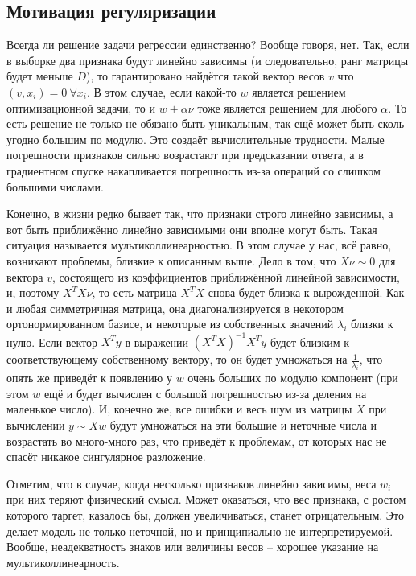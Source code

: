 \subsection{Мотивация регуляризации}

Всегда ли решение задачи регрессии единственно?
Вообще говоря, нет.
Так, если в выборке два признака будут линейно зависимы (и следовательно, ранг матрицы будет меньше $D$), то
гарантировано найдётся такой вектор весов $v$ что $(v,x_i) = 0~\forall x_i$.
В этом случае, если какой-то $w$ является решением оптимизационной задачи, то и $w+\alpha \nu$ тоже является
решением для любого $\alpha$.
То есть решение не только не обязано быть уникальным, так ещё может быть сколь угодно большим по модулю.
Это создаёт вычислительные трудности.
Малые погрешности признаков сильно возрастают при предсказании ответа, а в градиентном спуске накапливается
погрешность из-за операций со слишком большими числами.

Конечно, в жизни редко бывает так, что признаки строго линейно зависимы, а вот быть приближённо линейно зависимыми
они вполне могут быть.
Такая ситуация называется мультиколлинеарностью.
В этом случае у нас, всё равно, возникают проблемы, близкие к описанным выше.
Дело в том, что $X \nu \sim 0$ для вектора $v$, состоящего из коэффициентов приближённой линейной зависимости,
и, поэтому $X^T X \nu$, то есть матрица $X^T X$ снова будет близка к вырожденной.
Как и любая симметричная матрица, она диагонализируется в некотором ортонормированном базисе, и некоторые из
собственных значений $\lambda_i$ близки к нулю.
Если вектор $X^T y$ в выражении $(X^T X)^{-1} X^T y$ будет близким к соответствующему собственному вектору, то он
будет умножаться на $\frac{1}{\lambda_i}$, что опять же приведёт к появлению у $w$ очень больших по модулю
компонент (при этом $w$ ещё и будет вычислен с большой погрешностью из-за деления на маленькое число).
И, конечно же, все ошибки и весь шум из матрицы $X$ при вычислении $y \sim X w$ будут умножаться на эти большие и
неточные числа и возрастать во много-много раз, что приведёт к проблемам, от которых нас не спасёт никакое
сингулярное разложение.

Отметим, что в случае, когда несколько признаков линейно зависимы, веса $w_i$ при них теряют физический смысл.
Может оказаться, что вес признака, с ростом которого таргет, казалось бы, должен увеличиваться, станет отрицательным.
Это делает модель не только неточной, но и принципиально не интерпретируемой.
Вообще, неадекватность знаков или величины весов -- хорошее указание на мультиколлинеарность.

